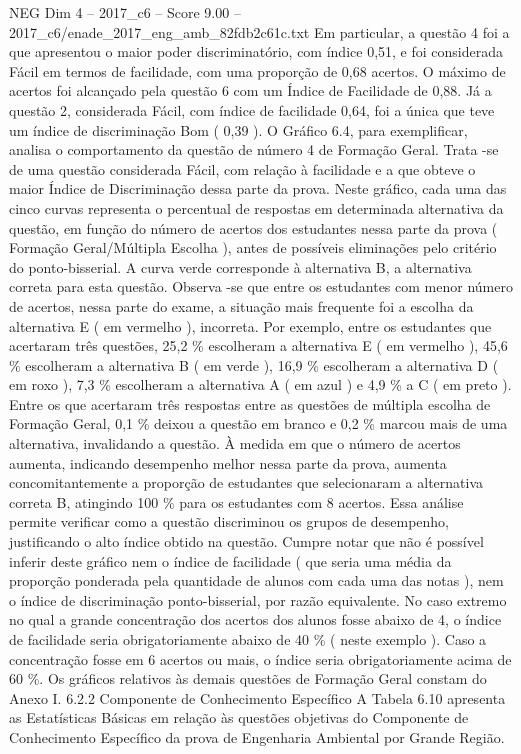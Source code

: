 \begin{textsample}{NEG Dim 4 – 2017\_c6 – Score 9.00 – 2017\_c6/enade\_2017\_eng\_amb\_82fdb2c61c.txt}
Em particular, a questão 4 foi a que apresentou o maior poder discriminatório, com índice 0,51, e foi considerada Fácil em termos de facilidade, com uma proporção de 0,68 acertos.
O máximo de acertos foi alcançado pela questão 6 com um Índice de Facilidade de 0,88.
Já a questão 2, considerada Fácil, com índice de facilidade 0,64, foi a única que teve um índice de discriminação Bom ( 0,39 ).
O Gráfico 6.4, para exemplificar, analisa o comportamento da questão de número 4 de Formação Geral.
Trata -se de uma questão considerada Fácil, com relação à facilidade e a que obteve o maior Índice de Discriminação dessa parte da prova.
Neste gráfico, cada uma das cinco curvas representa o percentual de respostas em determinada alternativa da questão, em função do número de acertos dos estudantes nessa parte da prova ( Formação Geral/Múltipla Escolha ), antes de possíveis eliminações pelo critério do ponto-bisserial.
A curva verde corresponde à alternativa B, a alternativa correta para esta questão.
Observa -se que entre os estudantes com menor número de acertos, nessa parte do exame, a situação mais frequente foi a escolha da alternativa E ( em vermelho ), incorreta.
Por exemplo, entre os estudantes que acertaram três questões, 25,2 \% escolheram a alternativa E ( em vermelho ), 45,6 \% escolheram a alternativa B ( em verde ), 16,9 \% escolheram a alternativa D ( em roxo ), 7,3 \% escolheram a alternativa A ( em azul ) e 4,9 \% a C ( em preto ).
Entre os que acertaram três respostas entre as questões de múltipla escolha de Formação Geral, 0,1 \% deixou a questão em branco e 0,2 \% marcou mais de uma alternativa, invalidando a questão.
À medida em que o número de acertos aumenta, indicando desempenho melhor nessa parte da prova, aumenta concomitantemente a proporção de estudantes que selecionaram a alternativa correta B, atingindo 100 \% para os estudantes com 8 acertos.
Essa análise permite verificar como a questão discriminou os grupos de desempenho, justificando o alto índice obtido na questão.
Cumpre notar que não é possível inferir deste gráfico nem o índice de facilidade ( que seria uma média da proporção ponderada pela quantidade de alunos com cada uma das notas ), nem o índice de discriminação ponto-bisserial, por razão equivalente.
No caso extremo no qual a grande concentração dos acertos dos alunos fosse abaixo de 4, o índice de facilidade seria obrigatoriamente abaixo de 40 \% ( neste exemplo ).
Caso a concentração fosse em 6 acertos ou mais, o índice seria obrigatoriamente acima de 60 \%.
Os gráficos relativos às demais questões de Formação Geral constam do Anexo I. 6.2.2 Componente de Conhecimento Específico A Tabela 6.10 apresenta as Estatísticas Básicas em relação às questões objetivas do Componente de Conhecimento Específico da prova de Engenharia Ambiental por Grande Região.

\end{textsample}
